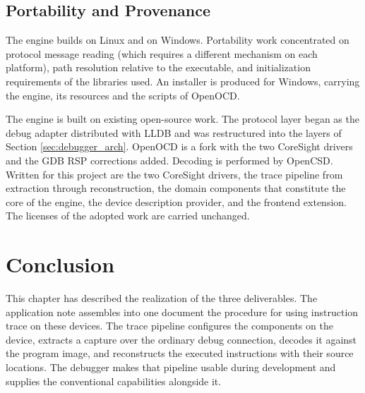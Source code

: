 \subsection{Portability and Provenance}
The engine builds on Linux and on Windows. Portability work concentrated on protocol message reading (which requires a different mechanism on each platform), path resolution relative to the executable, and initialization requirements of the libraries used. An installer is produced for Windows, carrying the engine, its resources and the scripts of OpenOCD.

The engine is built on existing open-source work. The protocol layer began as the debug adapter distributed with LLDB and was restructured into the layers of Section \ref{sec:debugger_arch}. OpenOCD is a fork with the two CoreSight drivers and the GDB RSP corrections added. Decoding is performed by OpenCSD. Written for this project are the two CoreSight drivers, the trace pipeline from extraction through reconstruction, the domain components that constitute the core of the engine, the device description provider, and the frontend extension. The licenses of the adopted work are carried unchanged.


\section{Conclusion}
This chapter has described the realization of the three deliverables. The application note assembles into one document the procedure for using instruction trace on these devices. The trace pipeline configures the components on the device, extracts a capture over the ordinary debug connection, decodes it against the program image, and reconstructs the executed instructions with their source locations. The debugger makes that pipeline usable during development and supplies the conventional capabilities alongside it.
